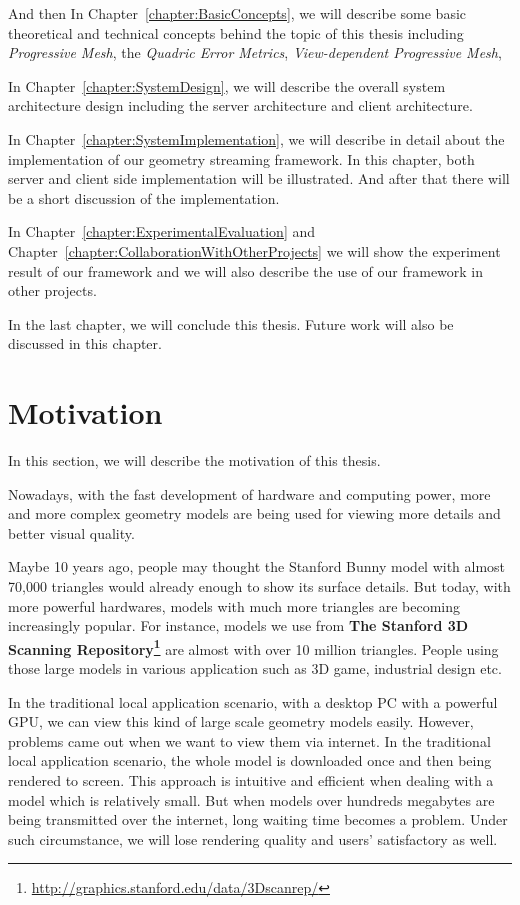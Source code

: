 \smallskip
And then In Chapter~\ref{chapter:BasicConcepts}, we will describe some basic theoretical and technical concepts behind the topic of this thesis including \emph{Progressive Mesh}, the \emph{Quadric Error Metrics}, \emph{View-dependent Progressive Mesh}, \etc

\smallskip
In Chapter~\ref{chapter:SystemDesign}, we will describe the overall system architecture design including the server architecture and client architecture. 

\smallskip
In Chapter~\ref{chapter:SystemImplementation}, we will describe in detail about the implementation of our geometry streaming framework. In this chapter, both server and client side implementation will be illustrated. And after that there will be a short discussion of the implementation. 

\smallskip
In Chapter~\ref{chapter:ExperimentalEvaluation} and Chapter~\ref{chapter:CollaborationWithOtherProjects} we will show the experiment result of our framework and we will also describe the use of our framework in other projects. 

In the last chapter, we will conclude this thesis. Future work will also be discussed in this chapter. 

\section{Motivation}
\label{section:motivation}
In this section, we will describe the motivation of this thesis. 

\smallskip
Nowadays, with the fast development of hardware and computing power, more and more complex geometry models are being used for viewing more details and better visual quality. 

\smallskip
Maybe 10 years ago, people may thought the Stanford Bunny model with almost 70,000 triangles would already enough to show its surface details. But today, with more powerful hardwares, models with much more triangles are becoming increasingly popular. For instance, models we use from \textbf{The Stanford 3D Scanning Repository\footnote{\label{S3DSR}\url{http://graphics.stanford.edu/data/3Dscanrep/}}} are almost with over 10 million triangles. People using those large models in various application such as 3D game, industrial design etc.
 
\smallskip
In the traditional local application scenario, with a desktop PC with a powerful GPU, we can view this kind of large scale geometry models easily. However, problems came out when we want to view them via internet. In the traditional local application scenario, the whole model is downloaded once and then being rendered to screen. This approach is intuitive and efficient when dealing with a model which is relatively small. But when models over hundreds megabytes are being transmitted over the internet, long waiting time becomes a problem. Under such circumstance, we will lose rendering quality and users' satisfactory as well. 

